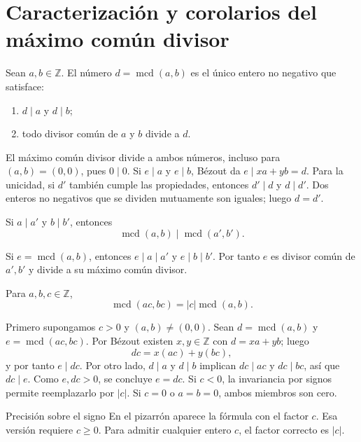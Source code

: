 \section{Caracterización y corolarios del máximo común divisor}
\begin{proposicion}
Sean $a,b\in\mathbb Z$. El número $d=\operatorname{mcd}(a,b)$ es el único entero no negativo que satisface:
\begin{enumerate}
\item $d\mid a$ y $d\mid b$;
\item todo divisor común de $a$ y $b$ divide a $d$.
\end{enumerate}
\end{proposicion}
\begin{demostracion}
El máximo común divisor divide a ambos números, incluso para $(a,b)=(0,0)$, pues $0\mid0$. Si $e\mid a$ y $e\mid b$, Bézout da $e\mid xa+yb=d$.
Para la unicidad, si $d'$ también cumple las propiedades, entonces $d'\mid d$ y $d\mid d'$. Dos enteros no negativos que se dividen mutuamente son iguales; luego $d=d'$.
\end{demostracion}
\begin{proposicion}[{title={Corolario: compatibilidad con la divisibilidad}}]
Si $a\mid a'$ y $b\mid b'$, entonces
\[
\operatorname{mcd}(a,b)\mid\operatorname{mcd}(a',b').
\]
\end{proposicion}
\begin{demostracion}
Si $e=\operatorname{mcd}(a,b)$, entonces $e\mid a\mid a'$ y $e\mid b\mid b'$. Por tanto $e$ es divisor común de $a',b'$ y divide a su máximo común divisor.
\end{demostracion}
\begin{proposicion}[{title={Corolario: multiplicación por un factor común}}]
Para $a,b,c\in\mathbb Z$,
\[
\operatorname{mcd}(ac,bc)=|c|\operatorname{mcd}(a,b).
\]
\end{proposicion}
\begin{demostracion}
Primero supongamos $c>0$ y $(a,b)\neq(0,0)$. Sean $d=\operatorname{mcd}(a,b)$ y $e=\operatorname{mcd}(ac,bc)$. Por Bézout existen $x,y\in\mathbb Z$ con $d=xa+yb$; luego
\[
dc=x(ac)+y(bc),
\]
y por tanto $e\mid dc$. Por otro lado, $d\mid a$ y $d\mid b$ implican $dc\mid ac$ y $dc\mid bc$, así que $dc\mid e$. Como $e,dc>0$, se concluye $e=dc$.
Si $c<0$, la invariancia por signos permite reemplazarlo por $|c|$. Si $c=0$ o $a=b=0$, ambos miembros son cero.
\end{demostracion}
\begin{nota}{Precisión sobre el signo}
En el pizarrón aparece la fórmula con el factor $c$. Esa versión requiere $c\geq0$. Para admitir cualquier entero $c$, el factor correcto es $|c|$.
\end{nota}


